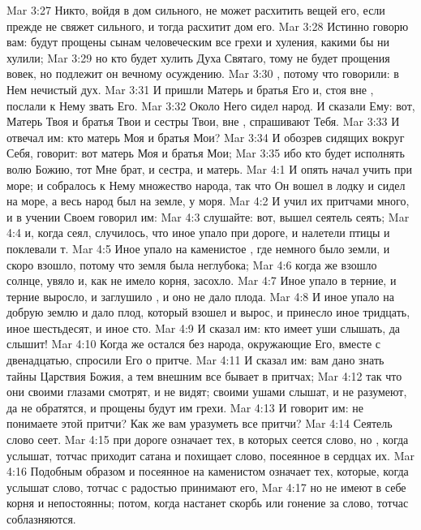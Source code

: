 \vs Mar 3:27 Никто, войдя в дом сильного, не может расхитить вещей его, если прежде не свяжет сильного, и тогда расхитит дом его.
\vs Mar 3:28 Истинно говорю вам: будут прощены сынам человеческим все грехи и хуления, какими бы ни хулили;
\vs Mar 3:29 но кто будет хулить Духа Святаго, тому не будет прощения вовек, но подлежит он вечному осуждению.
\vs Mar 3:30 , потому что говорили: в Нем нечистый дух.
\rsbpar\vs Mar 3:31 И пришли Матерь и братья Его и, стоя вне , послали к Нему звать Его.
\vs Mar 3:32 Около Него сидел народ. И сказали Ему: вот, Матерь Твоя и братья Твои и сестры Твои, вне , спрашивают Тебя.
\vs Mar 3:33 И отвечал им: кто матерь Моя и братья Мои?
\vs Mar 3:34 И обозрев сидящих вокруг Себя, говорит: вот матерь Моя и братья Мои;
\vs Mar 3:35 ибо кто будет исполнять волю Божию, тот Мне брат, и сестра, и матерь.
\vs Mar 4:1 И опять начал учить при море; и собралось к Нему множество народа, так что Он вошел в лодку и сидел на море, а весь народ был на земле, у моря.
\vs Mar 4:2 И учил их притчами много, и в учении Своем говорил им:
\vs Mar 4:3 слушайте: вот, вышел сеятель сеять;
\vs Mar 4:4 и, когда сеял, случилось, что иное упало при дороге, и налетели птицы и поклевали т.
\vs Mar 4:5 Иное упало на каменистое , где немного было земли, и скоро взошло, потому что земля была неглубока;
\vs Mar 4:6 когда же взошло солнце, увяло и, как не имело корня, засохло.
\vs Mar 4:7 Иное упало в терние, и терние выросло, и заглушило , и оно не дало плода.
\vs Mar 4:8 И иное упало на добрую землю и дало плод, который взошел и вырос, и принесло иное тридцать, иное шестьдесят, и иное сто.
\vs Mar 4:9 И сказал им: кто имеет уши слышать, да слышит!
\vs Mar 4:10 Когда же остался без народа, окружающие Его, вместе с двенадцатью, спросили Его о притче.
\vs Mar 4:11 И сказал им: вам дано знать тайны Царствия Божия, а тем внешним все бывает в притчах;
\vs Mar 4:12 так что они своими глазами смотрят, и не видят; своими ушами слышат, и не разумеют, да не обратятся, и прощены будут им грехи.
\vs Mar 4:13 И говорит им: не понимаете этой притчи? Как же вам уразуметь все притчи?
\vs Mar 4:14 Сеятель слово сеет.
\vs Mar 4:15  при дороге означает тех, в которых сеется слово, но , когда услышат, тотчас приходит сатана и похищает слово, посеянное в сердцах их.
\vs Mar 4:16 Подобным образом и посеянное на каменистом  означает тех, которые, когда услышат слово, тотчас с радостью принимают его,
\vs Mar 4:17 но не имеют в себе корня и непостоянны; потом, когда настанет скорбь или гонение за слово, тотчас соблазняются.
